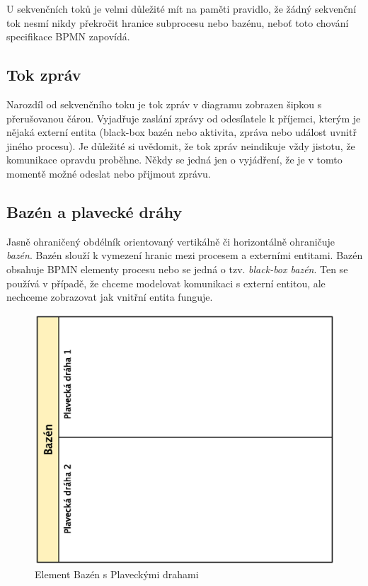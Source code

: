 \documentclass[]{article}
\begin{document}
U sekvenčních toků je velmi důležité mít na paměti pravidlo, že žádný sekvenční tok nesmí nikdy překročit hranice subprocesu nebo bazénu, neboť toto chování specifikace BPMN zapovídá.

\subsection{Tok zpráv}
Narozdíl od sekvenčního toku je tok zpráv v diagramu zobrazen šipkou s přerušovanou čárou. Vyjadřuje zaslání zprávy od odesílatele k příjemci, kterým je nějaká externí entita (black-box bazén nebo aktivita, zpráva nebo událost uvnitř jiného procesu). Je důležité si uvědomit, že tok zpráv neindikuje vždy jistotu, že komunikace opravdu proběhne. Někdy se jedná jen o vyjádření, že je v tomto momentě možné odeslat nebo přijmout zprávu.

\subsection{Bazén a plavecké dráhy}
Jasně ohraničený obdélník orientovaný vertikálně či horizontálně ohraničuje \textit{bazén}. Bazén slouží k vymezení hranic mezi procesem a externími entitami. Bazén obsahuje BPMN elementy procesu nebo se jedná o tzv.\textit{ black-box bazén}. Ten se používá v případě, že chceme modelovat komunikaci s externí entitou, ale nechceme zobrazovat jak vnitřní entita funguje.

\begin{figure}[H]\centering
\includegraphics[scale=0.7]{obrazky/pool-swimming_lane}
\caption{Element Bazén s Plaveckými drahami}
\label{fig:bazen}
\end{figure}
\end{document}
